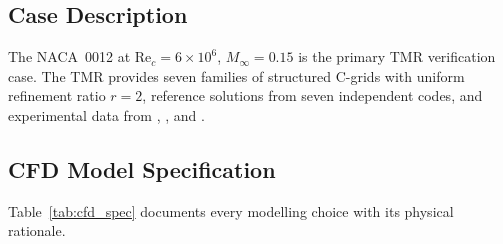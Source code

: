 \documentclass[11pt,a4paper]{article}
\begin{document}
\subsection{Case Description}

The NACA~0012 at $\text{Re}_c = 6\times10^6$, $M_\infty = 0.15$ is the primary
TMR verification case. The TMR provides seven families of structured C-grids
with uniform refinement ratio $r=2$, reference solutions from seven independent
codes, and experimental data from \cite{Ladson1988}, \cite{GregoryOReilly1970},
and \cite{AbbottVonDoenhoff1959}.

\subsection{CFD Model Specification}
\label{sec:cfd_spec}

Table~\ref{tab:cfd_spec} documents every modelling choice with its physical rationale.
\end{document}
